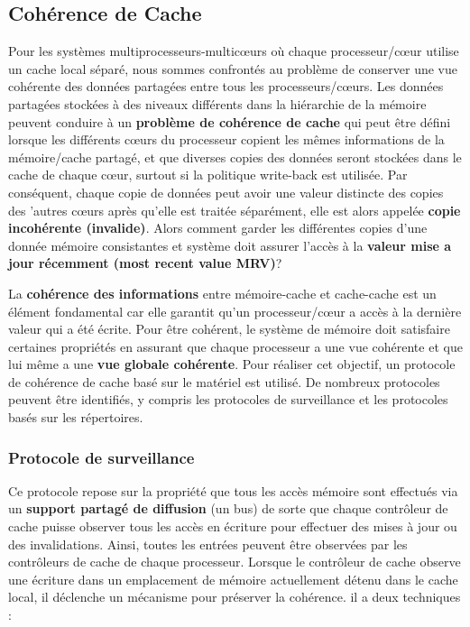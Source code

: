 \subsection{Cohérence de Cache}
%
Pour les systèmes multiprocesseurs-multicœurs où chaque processeur/cœur utilise un cache local séparé, nous sommes confrontés au problème de conserver une vue cohérente des données partagées entre tous les processeurs/cœurs. 
Les données partagées stockées à des niveaux différents dans la hiérarchie de la mémoire peuvent conduire à un \textbf{problème de cohérence de cache} qui peut être défini lorsque les différents cœurs du processeur copient les mêmes informations de la mémoire/cache partagé, et que diverses copies des données seront stockées dans le cache de chaque cœur, surtout si la politique write-back est utilisée.
Par conséquent, chaque copie de données peut avoir une valeur distincte des copies des 'autres cœurs après qu'elle est traitée séparément, elle est alors appelée \textbf{copie incohérente (invalide)}. \cite{raub13}
Alors comment garder les différentes copies d'une donnée mémoire consistantes et système doit assurer l'accès à la \textbf{valeur mise a jour récemment (most recent value MRV)}?

La \textbf{cohérence des informations} entre mémoire-cache et cache-cache est un élément fondamental car elle garantit qu'un processeur/cœur a accès à la dernière valeur qui a été écrite.
Pour être cohérent, le système de mémoire doit satisfaire certaines propriétés en assurant que chaque processeur a une vue cohérente et que lui même a une \textbf{vue globale cohérente}.
Pour réaliser cet objectif, un protocole de cohérence de cache basé sur le matériel est utilisé. 
De nombreux protocoles peuvent être identifiés, y compris les protocoles de surveillance et les protocoles basés sur les répertoires.
%
\subsubsection{Protocole de surveillance}
%
Ce protocole repose sur la propriété que tous les accès mémoire sont effectués via un \textbf{support partagé de diffusion} (un bus)
de sorte que chaque contrôleur de cache puisse observer tous les accès en écriture pour effectuer des mises à jour ou des invalidations.
Ainsi, toutes les entrées peuvent être observées par les contrôleurs de cache de chaque processeur. 
Lorsque le contrôleur de cache observe une écriture dans un emplacement de mémoire actuellement détenu dans le cache local, il déclenche un mécanisme pour préserver la cohérence.
il a deux techniques :

